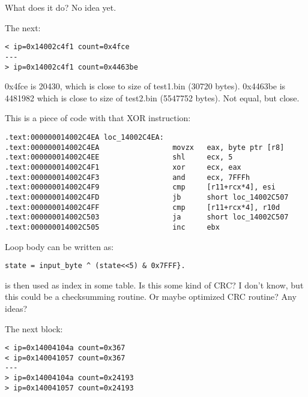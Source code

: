 What does it do? No idea yet.

The next:

\begin{lstlisting}
< ip=0x14002c4f1 count=0x4fce
---
> ip=0x14002c4f1 count=0x4463be
\end{lstlisting}

0x4fce is 20430, which is close to size of test1.bin (30720 bytes).
0x4463be is 4481982 which is close to size of test2.bin (5547752 bytes).
Not equal, but close.

This is a piece of code with that XOR instruction:

\begin{lstlisting}
.text:000000014002C4EA loc_14002C4EA:
.text:000000014002C4EA                 movzx   eax, byte ptr [r8]
.text:000000014002C4EE                 shl     ecx, 5
.text:000000014002C4F1                 xor     ecx, eax
.text:000000014002C4F3                 and     ecx, 7FFFh
.text:000000014002C4F9                 cmp     [r11+rcx*4], esi
.text:000000014002C4FD                 jb      short loc_14002C507
.text:000000014002C4FF                 cmp     [r11+rcx*4], r10d
.text:000000014002C503                 ja      short loc_14002C507
.text:000000014002C505                 inc     ebx
\end{lstlisting}

Loop body can be written as:

\begin{lstlisting}
state = input_byte ^ (state<<5) & 0x7FFF}.
\end{lstlisting}

 is then used as index in some table. Is this some kind of \ac{CRC}? I don't know, but this could be a checksumming routine.
Or maybe optimized \ac{CRC} routine?
Any ideas?

The next block:

\begin{lstlisting}
< ip=0x14004104a count=0x367
< ip=0x140041057 count=0x367
---
> ip=0x14004104a count=0x24193
> ip=0x140041057 count=0x24193
\end{lstlisting}

